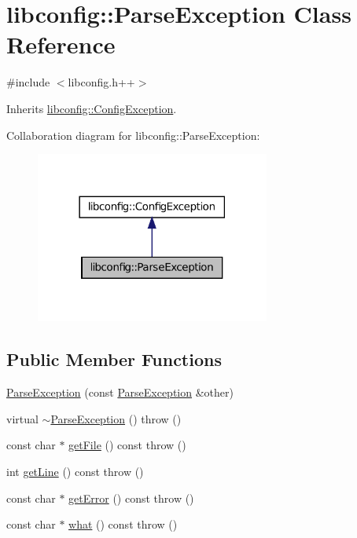\hypertarget{classlibconfig_1_1_parse_exception}{
\section{libconfig::ParseException Class Reference}
\label{classlibconfig_1_1_parse_exception}
}


{\ttfamily \#include $<$libconfig.h++$>$}



Inherits \hyperlink{classlibconfig_1_1_config_exception}{libconfig::ConfigException}.



Collaboration diagram for libconfig::ParseException:
\nopagebreak
\begin{figure}[H]
\begin{center}
\leavevmode
\includegraphics[width=218pt]{classlibconfig_1_1_parse_exception__coll__graph}
\end{center}
\end{figure}
\subsection*{Public Member Functions}
\begin{DoxyCompactItemize}
\item 
\hyperlink{classlibconfig_1_1_parse_exception_af4ca2a2b778b7b25e96620a816ac1122}{ParseException} (const \hyperlink{classlibconfig_1_1_parse_exception}{ParseException} \&other)
\item 
virtual \hyperlink{classlibconfig_1_1_parse_exception_a5bf6aa3e7294e7d07bfd04b384fb4949}{$\sim$ParseException} ()  throw ()
\item 
const char $\ast$ \hyperlink{classlibconfig_1_1_parse_exception_a948a2d4211dd6f579ac55cf91c7b7e64}{getFile} () const   throw ()
\item 
int \hyperlink{classlibconfig_1_1_parse_exception_ac63b7930920082fcbfe48124fe1705a4}{getLine} () const   throw ()
\item 
const char $\ast$ \hyperlink{classlibconfig_1_1_parse_exception_a9ff389ad37d4208f5d29a3b1b26fff58}{getError} () const   throw ()
\item 
const char $\ast$ \hyperlink{classlibconfig_1_1_parse_exception_ab2f096f652382ceacd418c5d8104f0c5}{what} () const   throw ()
\end{DoxyCompactItemize}
